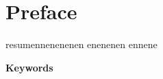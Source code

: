 \section{Preface} 

resumennenenenen enenenen ennene 
	\begin{large}
		
		\textbf{Keywords} \\
	\end{large}